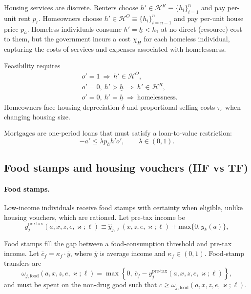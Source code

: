 \documentclass[parskip=full]{article}
\theoremstyle{plain}
\theoremstyle{definition}
\theoremstyle{remark}
\begin{document}
Housing services are discrete. Renters choose $h'\in\mathcal{H}^R\equiv\{h_i\}_{i=1}^n$ and pay per-unit rent $p_r$. Homeowners choose $h'\in\mathcal{H}^O\equiv\{h_i\}_{i=n-1}^n$ and pay per-unit house price $p_h$. Homeless individuals consume $h'=\underline h<h_1$ at no direct (resource) cost to them, but the government incurs a cost $\chi_{H}$ for each homeless individual, capturing the costs of services and expenses associated with homelessness. 

Feasibility requires
\begin{equation}\label{eq:housing_feas}
\begin{aligned}
&o'=1 \ \Rightarrow\ h'\in\mathcal{H}^O, \\
&o'=0,\ h'>\underline h \ \Rightarrow\ h'\in\mathcal{H}^R, \\
&o'=0,\ h'=\underline h \ \Rightarrow\ \text{homelessness.}
\end{aligned}
\end{equation}
Homeowners face housing depreciation $\delta$ and proportional selling costs $\tau_s$ when changing housing size.

Mortgages are one-period loans that must satisfy a loan-to-value restriction:
\begin{equation}\label{eq:ltv}
-a' \le \lambda p_h h'o' , \qquad \lambda\in(0,1).
\end{equation}

\subsection{Food stamps and housing vouchers (HF vs TF)}\label{sec:programs}

\paragraph{Food stamps.}
Low-income individuals receive food stamps with certainty when eligible, unlike housing vouchers, which are rationed. Let pre-tax income be
\[y_j^{\text{pre-tax}}(a,x,z,e,\varkappa;\ell)\equiv \hat y_{j,\ell}(x,z,e,\varkappa;\ell)+\text{max}\{0,\hat y_k(a)\},\]

Food stamps fill the gap between a food-consumption threshold and pre-tax income. Let
$\bar c_f = \kappa_f \cdot \overline{y}$, where $\overline{y}$ is average income and $\kappa_f\in(0,1)$. Food-stamp transfers are
\begin{equation}
\label{eq:food_rule}
\omega_{j,\text{food}}(a,x,z,e,\varkappa;\ell)=\max\left\{0,\ \bar c_f - y_{j}^{\text{pre-tax}}(a,x,z,e,\varkappa;\ell)\right\},
\end{equation}
and must be spent on the non-drug good such that $c\geq \omega_{j,\text{food}}(a,x,z,e,\varkappa;\ell)$.
\end{document}
